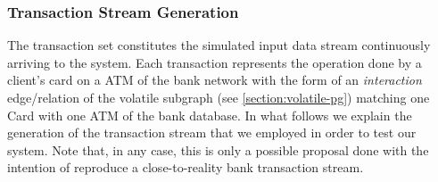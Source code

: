 

\begin{comment}

Sobre el número de cards y ATMs algunos bancos pequeños en España como la caja rural de Aragón tienen 14000 clientes y en torno a 200 sucursales (que podemos asumir como el número de ATMs, aunque sería algo más al tener más de 1 ATM por sucursal lo más seguro). Otros bancos pequeños (tipo cajas rurales) también suelen tener en torno a 100-200 sucursales y  algunos incluso 10^5 clientes.

En cuanto al número de transacciones, he estado mirando y algunos artículos juegan con un set de transacciones de en torno a 10^6 o 10⁵. Considerando que nuestro generador de transacciones como mucho crea una transaccion por card por día (basado en los datos del wisabi). Podríamos generar 1 mes de transacciones para 15000 cards y 200 ATMs, que podría dar  como mucho un stream de unas 450000 transacciones. 

\end{comment}


\subsubsection*{Transaction Stream Generation}


The transaction set constitutes the simulated input data stream continuously arriving to the system. Each transaction represents the operation done by a client's card on a ATM of the bank network with the form of an \emph{interaction} edge/relation of the volatile subgraph (see \ref{section:volatile-pg}) matching one Card with one ATM of the bank database. In what follows we explain the generation of the transaction stream that we employed in order to test our system. Note that, in any case, this is only a possible proposal done with the intention of reproduce a close-to-reality bank transaction stream.

